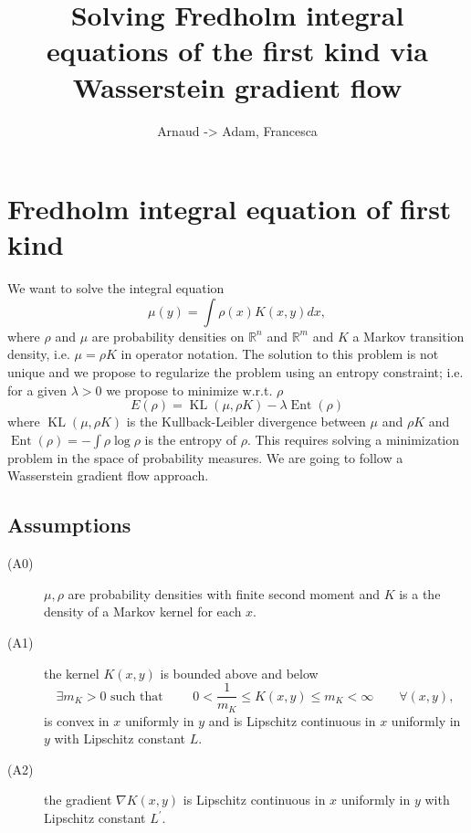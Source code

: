 \documentclass[a4paper]{article}
\title{Solving Fredholm integral equations of the first kind via Wasserstein gradient flow}
\author{Arnaud -> Adam, Francesca }
\date{ }
\theoremstyle{definition}
\DeclareMathOperator{\KL}{KL}
\DeclareMathOperator{\ent}{Ent}
\def\real{\mathbb{R}}
\begin{document}
\maketitle


\graphicspath{{Images/}}

\section{Fredholm integral equation of first kind}

We want to solve the integral equation
\[
\mu(y)=\int\rho\left(x\right)K(x,y)dx,
\]
where $\rho$ and $\mu$ are probability densities on $\real^{n}$ and $\real^{m}$ and $K$ a Markov transition density, i.e. $\mu=\rho K$ in operator notation. The solution to this problem is not unique and we propose to regularize the problem using an entropy constraint; i.e. for a given $\lambda>0$ we propose to minimize w.r.t. $\rho$
\begin{equation}
\label{eq:minimisation}
E(\rho)=\KL(\mu,\rho K)-\lambda\ent(\rho)
\end{equation}
where 
$\KL(\mu,\rho K)$ is the Kullback-Leibler divergence between $\mu$ and $\rho K$ and $\ent(\rho)=-\int\rho\log\rho$ is the entropy of $\rho$.
This requires solving a minimization problem in the space of probability measures. We are going to follow a Wasserstein gradient flow approach.

\subsection{Assumptions}
\begin{description}
\item[(A0)\label{a}] $\mu, \rho$ are probability densities with finite second moment and $K$ is a the density of a Markov kernel for each $x$.
\item[(A1)\label{a:k}] the kernel $K(x, y)$ is bounded above and below
\begin{equation*}
 \exists m_K>0 \text{ such that }\qquad 0<  \frac{1}{m_K} \leq  K(x, y)\leq m_K < \infty \qquad \forall (x, y),
\end{equation*}
is convex in $x$ uniformly in $y$ and is Lipschitz continuous in $x$ uniformly in $y$ with Lipschitz constant $L$.
\item[(A2)\label{a:gradientk}] the gradient $\nabla K(x, y)$ is Lipschitz continuous in $x$ uniformly in $y$ with Lipschitz constant $L^\prime$.
\end{description}
\end{document}

